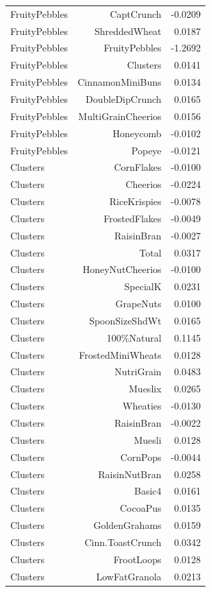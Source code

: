 \begin{longtable}{@{}lrr@{}}
FruityPebbles & CaptCrunch & -0.0209 \\
FruityPebbles & ShreddedWheat & 0.0187 \\
FruityPebbles & FruityPebbles & -1.2692 \\
FruityPebbles & Clusters & 0.0141 \\
FruityPebbles & CinnamonMiniBuns & 0.0134 \\
FruityPebbles & DoubleDipCrunch & 0.0165 \\
FruityPebbles & MultiGrainCheerios & 0.0156 \\
FruityPebbles & Honeycomb & -0.0102 \\
FruityPebbles & Popeye & -0.0121 \\
Clusters & CornFlakes & -0.0100 \\
Clusters & Cheerios & -0.0224 \\
Clusters & RiceKrispies & -0.0078 \\
Clusters & FrostedFlakes & -0.0049 \\
Clusters & RaisinBran & -0.0027 \\
Clusters & Total & 0.0317 \\
Clusters & HoneyNutCheerios & -0.0100 \\
Clusters & SpecialK & 0.0231 \\
Clusters & GrapeNuts & 0.0100 \\
Clusters & SpoonSizeShdWt & 0.0165 \\
Clusters & 100\%Natural & 0.1145 \\
Clusters & FrostedMiniWheats & 0.0128 \\
Clusters & NutriGrain & 0.0483 \\
Clusters & Mueslix & 0.0265 \\
Clusters & Wheaties & -0.0130 \\
Clusters & RaisinBran & -0.0022 \\
Clusters & Muesli & 0.0128 \\
Clusters & CornPops & -0.0044 \\
Clusters & RaisinNutBran & 0.0258 \\
Clusters & Basic4 & 0.0161 \\
Clusters & CocoaPus & 0.0135 \\
Clusters & GoldenGrahams & 0.0159 \\
Clusters & Cinn.ToastCrunch & 0.0342 \\
Clusters & FrootLoops & 0.0128 \\
Clusters & LowFatGranola & 0.0213 \\

\end{longtable}
